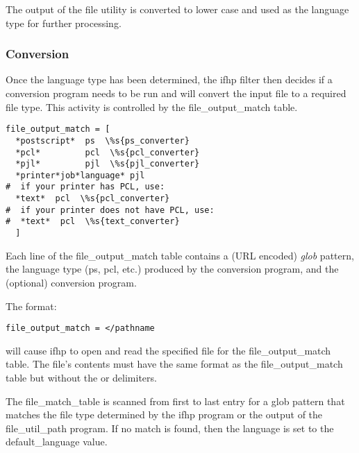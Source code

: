 \documentclass[a4paper]{article}
\begin{document}
The output of the file utility is converted to lower case and
used as the language type for further processing.


\subsubsection{Conversion
\label{file_output_match}
\label{text_converter}
\label{ps_converter}
\label{pcl_converter}
\label{pjl_converter}
\label{wrappers}
\label{language}}

Once the language type has been determined,
the {\ttfamily ifhp} filter then decides if a conversion program
needs to be run and will convert the input file to a required file type.
This activity is  controlled by the {\ttfamily file\_output\_match}
table.
\begin{tscreen}
\begin{verbatim}
file_output_match = [
  *postscript*  ps  \%s{ps_converter}
  *pcl*         pcl  \%s{pcl_converter}
  *pjl*         pjl  \%s{pjl_converter}
  *printer*job*language* pjl
#  if your printer has PCL, use:
  *text*  pcl  \%s{pcl_converter}
#  if your printer does not have PCL, use:
#  *text*  pcl  \%s{text_converter}
  ]
\end{verbatim}
\end{tscreen}

Each line of the
{\ttfamily file\_output\_match}
table contains
a (URL encoded) {\itshape glob\/} pattern,
the language type ({\ttfamily ps}, {\ttfamily pcl}, etc.) produced by the conversion program,
and the (optional) conversion program.

The format:
\begin{tscreen}
\begin{verbatim}
file_output_match = </pathname
\end{verbatim}
\end{tscreen}


will cause {\ttfamily ifhp} to open and read the specified file
for the {\ttfamily file\_output\_match} table.
The file's contents must have the same format as the
{\ttfamily file\_output\_match} table but without the {\ttfamily {[}} or {\ttfamily {]}} delimiters.

The {\ttfamily file\_match\_table} is scanned from first to last entry
for a {\ttfamily glob} pattern that
matches the file type determined by the {\ttfamily ifhp} program or the output of the
{\ttfamily file\_util\_path} program.
If no match is found,
then the language is set to the
{\ttfamily default\_language} value.
\end{document}
